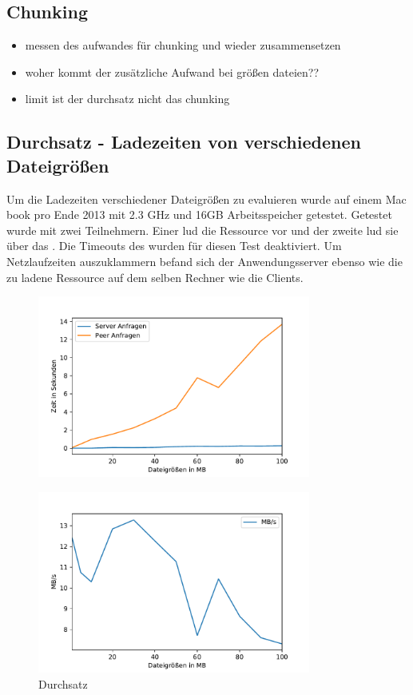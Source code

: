 \subsection{Chunking}
\begin{itemize}
	\item messen des aufwandes für chunking und wieder zusammensetzen
	\item woher kommt der zusätzliche Aufwand bei größen dateien??
	\item limit ist der durchsatz nicht das chunking
\end{itemize}

\subsection{Durchsatz - Ladezeiten von verschiedenen Dateigrößen}
Um die Ladezeiten verschiedener Dateigrößen zu evaluieren wurde auf einem Mac book pro Ende 2013 mit 2.3 GHz und 16GB Arbeitsspeicher getestet. 
Getestet wurde mit zwei Teilnehmern. Einer lud die Ressource vor und der zweite lud sie über das \pTp \cdn. Die Timeouts des \pTp \cdns wurden für diesen Test deaktiviert. Um Netzlaufzeiten auszuklammern befand sich der Anwendungsserver ebenso wie die zu ladene Ressource auf dem selben Rechner wie die Clients. 

\begin{figure}[!h]
	\centering
	\includegraphics[width=0.8\textwidth]{figures/Timing_file_size}
	\caption[A Figure Short-Title]{}
	\label{fig:timing_file_size}
\end{figure}

\begin{figure}[!h]
	\centering
	\includegraphics[width=0.8\textwidth]{figures/durchsatz_file_size}
	\caption[A Figure Short-Title]{Durchsatz}
	\label{fig:durchsatz_file_size}
\end{figure}


